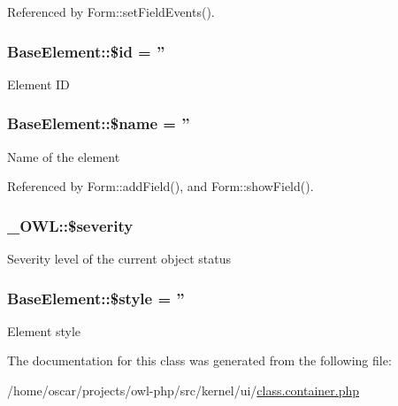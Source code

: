 Referenced by Form::setFieldEvents().

\subsubsection[{\$id}]{\setlength{\rightskip}{0pt plus 5cm}BaseElement::\$id = ''}\label{classBaseElement_a11b6989c43b53869a09f5ce65aa55b45}
Element ID 
\subsubsection[{\$name}]{\setlength{\rightskip}{0pt plus 5cm}BaseElement::\$name = ''}\label{classBaseElement_a30b8cff187a9de659a70daf287d66f45}
Name of the element 

Referenced by Form::addField(), and Form::showField().

\subsubsection[{\$severity}]{\setlength{\rightskip}{0pt plus 5cm}\_\-OWL::\$severity}\label{class__OWL_ad26b40a9dbbacb33e299b17826f8327c}
Severity level of the current object status 
\subsubsection[{\$style}]{\setlength{\rightskip}{0pt plus 5cm}BaseElement::\$style = ''}\label{classBaseElement_a429a3d642dd95f30e1059ef29564b87d}
Element style 

The documentation for this class was generated from the following file:\begin{DoxyCompactItemize}
\item 
/home/oscar/projects/owl-\/php/src/kernel/ui/\hyperlink{kernel_2ui_2class_8container_8php}{class.container.php}\end{DoxyCompactItemize}
